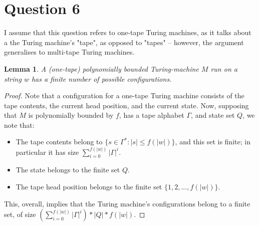 \documentclass[a4paper,12pt]{scrartcl}
\newtheorem{lemma}{Lemma}
\begin{document}
\section{Question 6}
    I assume that this question refers to one-tape Turing machines, as it talks about a the Turing machine's "tape", as opposed to "tapes" -- however, the argument generalises to multi-tape Turing machines.
\begin{lemma}
    A (one-tape) polynomially bounded Turing-machine $M$ run on a string $w$ has a finite number of possible configurations.
\end{lemma}
\begin{proof}
    Note that a configuration for a one-tape Turing machine consists of the tape contents, the current head position, and the current state. Now, supposing that $M$ is polynomially bounded by $f$, has a tape alphabet $\Gamma$, and state set $Q$, we note that:
    \begin{itemize}
        \item The tape contents belong to $\{ s \in \Gamma^* : |s| \leq f(|w|) \}$, and this set is finite; in particular it has size $\sum_{i = 0}^{f(|w|)} |\Gamma| ^ i$.
        \item The state belongs to the finite set $Q$.
        \item The tape head position belongs to the finite set $\{1, 2, ..., f(|w|)\}$.
    \end{itemize}
    This, overall, implies that the Turing machine's configurations belong to a finite set, of size $(\sum_{i = 0}^{f(|w|)}|\Gamma|^i) * |Q| * f(|w|)$.
\end{proof}
\end{document}
